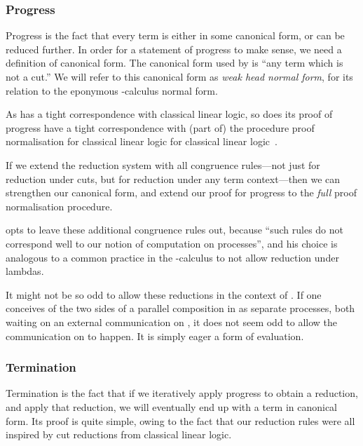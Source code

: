 \subsubsection{Progress}
Progress is the fact that every term is either in some canonical form, or can be
reduced further. In order for a statement of progress to make sense, we need a
definition of canonical form. The canonical form used by \cp is ``any term which
is not a cut.'' We will refer to this canonical form as \emph{weak head normal
form}, for its relation to the eponymous \textlambda-calculus normal form. 

As \cp has a tight correspondence with classical linear logic, so does its proof
of progress have a tight correspondence with (part of) the procedure proof
normalisation for classical linear logic for classical linear
logic~\parencite{girard1987}.

If we extend the reduction system with all congruence rules---not just
\cpRedGammaCut for reduction under cuts, but for reduction under any term
context---then we can strengthen our canonical form, and extend our proof for
progress to the \emph{full} proof normalisation procedure.


\textcite{wadler2012} opts to leave these additional congruence rules out,
because ``such rules do not correspond well to our notion of computation on
processes'', and his choice is analogous to a common practice in the
\textlambda-calculus to not allow reduction under lambdas.

It might not be so odd to allow these reductions in the context of \cp.
If one conceives of the two sides of a parallel composition in
 as separate processes, both waiting on an
external communication on , it does not seem odd to allow the
communication on  to happen. It is simply eager a form of evaluation.

\subsubsection{Termination}
\label{sec:cp-termination}
Termination is the fact that if we iteratively apply progress to obtain a
reduction, and apply that reduction, we will eventually end up with a term in
canonical form.
Its proof is quite simple, owing to the fact that our reduction rules were all
inspired by cut reductions from classical linear logic.


